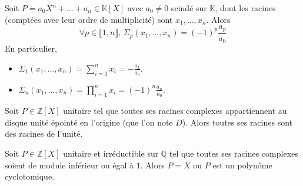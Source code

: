 
	\begin{application}
		Soit $P = a_0X^n + \dots + a_n \in \mathbb{K}[X]$ avec $a_0 \neq 0$ scindé sur $\mathbb{K}$, dont les racines (comptées avec leur ordre de multiplicité) sont $x_1, \dots, x_n$. Alors
		\[ \forall p \in \llbracket 1, n \rrbracket, \, \Sigma_p(x_1, \dots, x_n) = (-1)^p \frac{a_p}{a_0} \]
		En particulier,
		\begin{itemize}
			\item $\Sigma_1(x_1, \dots, x_n) = \sum_{i=1}^n x_i = -\frac{a_1}{a_0}$.
			\item $\Sigma_n(x_1, \dots, x_n) = \prod_{i=1}^n x_i = (-1)^n \frac{a_n}{a_0}$.
		\end{itemize}
	\end{application}


	\begin{application}
		Soit $P \in \mathbb{Z}[X]$ unitaire tel que toutes ses racines complexes appartiennent au disque unité épointé en l'origine (que l'on note $D$). Alors toutes ses racines sont des racines de l'unité.
	\end{application}

	\begin{corollary}
		Soit $P \in \mathbb{Z}[X]$ unitaire et irréductible sur $\mathbb{Q}$ tel que toutes ses racines complexes soient de module inférieur ou égal à $1$. Alors $P = X$ ou $P$ est un polynôme cyclotomique.
	\end{corollary}


